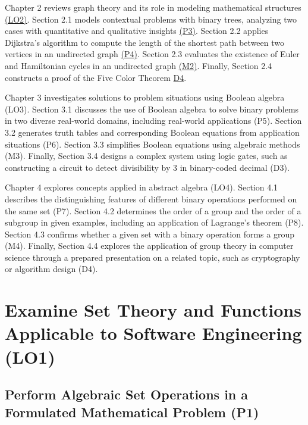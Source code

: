 \documentclass[12pt, a4paper]{report} %
\renewcommand{\sectionmark}[1]{%
  \markright{\thesection: #1}} %
\begin{document}
Chapter 2 reviews graph theory and its role in modeling mathematical structures \hyperref[chap:LO2]{(LO2)}. Section 2.1 models contextual problems with binary trees, analyzing two cases with quantitative and qualitative insights \hyperref[sec:P3]{(P3)}. Section 2.2 applies Dijkstra's algorithm to compute the length of the shortest path between two vertices in an undirected graph \hyperref[sec:P4]{(P4)}. Section 2.3 evaluates the existence of Euler and Hamiltonian cycles in an undirected graph \hyperref[sec:M2]{(M2)}. Finally, Section 2.4 constructs a proof of the Five Color Theorem \hyperref[sec:D4]{D4}.

Chapter 3 investigates solutions to problem situations using Boolean algebra (LO3). Section 3.1 discusses the use of Boolean algebra to solve binary problems in two diverse real-world domains, including real-world applications (P5). Section 3.2 generates truth tables and corresponding Boolean equations from application situations (P6). Section 3.3 simplifies Boolean equations using algebraic methods (M3). Finally, Section 3.4 designs a complex system using logic gates, such as constructing a circuit to detect divisibility by 3 in binary-coded decimal (D3).

Chapter 4 explores concepts applied in abstract algebra (LO4). Section 4.1 describes the distinguishing features of different binary operations performed on the same set (P7). Section 4.2 determines the order of a group and the order of a subgroup in given examples, including an application of Lagrange's theorem (P8). Section 4.3 confirms whether a given set with a binary operation forms a group (M4). Finally, Section 4.4 explores the application of group theory in computer science through a prepared presentation on a related topic, such as cryptography or algorithm design (D4).


\chapter{Examine Set Theory and Functions Applicable to Software Engineering (LO1)}
\label{chap:LO1}
\section{Perform Algebraic Set Operations in a Formulated Mathematical Problem (P1)}
\label{sec:P1}
\end{document}
